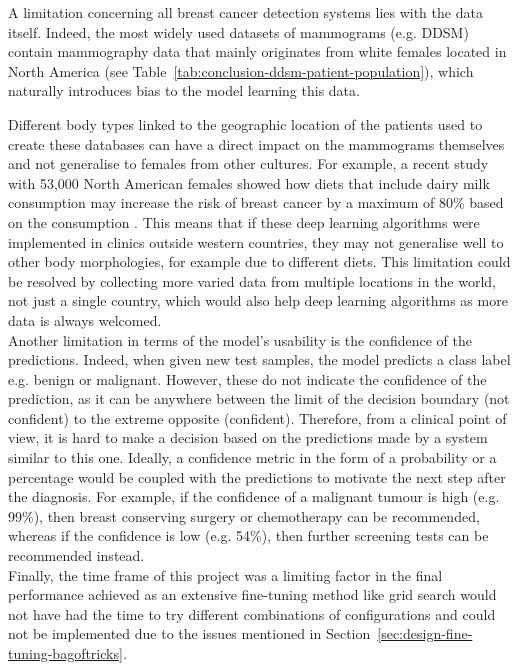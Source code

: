 A limitation concerning all breast cancer detection systems lies with the data itself. Indeed, the most widely used datasets of mammograms (e.g. DDSM) contain mammography data that mainly originates from white females located in North America (see Table~\ref{tab:conclusion-ddsm-patient-population}), which naturally introduces bias to the model learning this data.



Different body types linked to the geographic location of the patients used to create these databases can have a direct impact on the mammograms themselves and not generalise to females from other cultures. For example, a recent study with 53,000 North American females showed how diets that include dairy milk consumption may increase the risk of breast cancer by a maximum of 80\% based on the consumption \citep{Fraser2020}. This means that if these deep learning algorithms were implemented in clinics outside western countries, they may not generalise well to other body morphologies, for example due to different diets. This limitation could be resolved by collecting more varied data from multiple locations in the world, not just a single country, which would also help deep learning algorithms as more data is always welcomed.\\

Another limitation in terms of the model's usability is the confidence of the predictions. Indeed, when given new test samples, the model predicts a class label e.g. benign or malignant. However, these do not indicate the confidence of the prediction, as it can be anywhere between the limit of the decision boundary (not confident) to the extreme opposite (confident). Therefore, from a clinical point of view, it is hard to make a decision based on the predictions made by a system similar to this one. Ideally, a confidence metric in the form of a probability or a percentage would be coupled with the predictions to motivate the next step after the diagnosis. For example, if the confidence of  a malignant tumour is high (e.g. 99\%),  then breast conserving surgery or chemotherapy can be recommended, whereas if the confidence is low (e.g. 54\%), then further screening tests can be recommended instead.\\

Finally, the time frame of this project was a limiting factor in the final performance achieved as an extensive fine-tuning method like grid search would not have had the time to try different combinations of configurations and could not be implemented due to the issues mentioned in Section~\ref{sec:design-fine-tuning-bagoftricks}.
    
